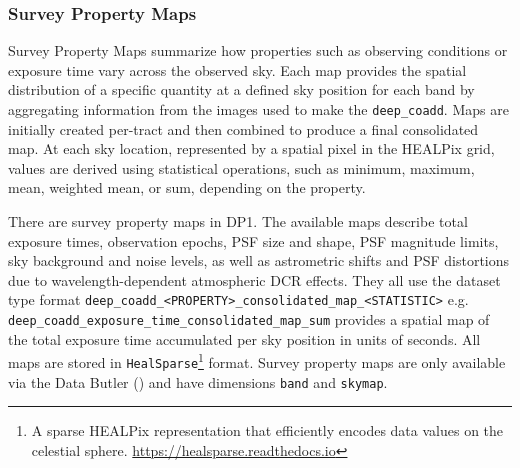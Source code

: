 \subsubsection{Survey Property Maps}
Survey Property Maps summarize how properties such as observing conditions or exposure time vary across the observed sky.
Each map provides the spatial distribution of a specific quantity at a defined sky position for each band by aggregating information from the images used to make the \texttt{deep\_coadd}.
Maps are initially created per-\gls{tract} and then combined to produce a final consolidated map.
At each sky location, represented by a spatial pixel in the \gls{HEALPix} grid, values are derived using statistical operations, such as minimum, maximum, mean, weighted mean, or sum, depending on the property.

There are \nsurveypropertymaps survey property maps in \gls{DP1}.
The available maps describe total exposure times, observation epochs, \gls{PSF} size and \gls{shape}, \gls{PSF} magnitude limits, sky \gls{background} and noise levels, as well as astrometric shifts and \gls{PSF} distortions due to wavelength-dependent atmospheric \gls{DCR} effects.
They all use the dataset type  format \texttt{deep\_coadd\_<PROPERTY>\_consolidated\_map\_<STATISTIC>}
e.g. \texttt{deep\_coadd\_exposure\_time\_consolidated\_map\_sum} provides a spatial map of the total exposure time accumulated per
sky position in units of seconds.
All maps are stored in \texttt{HealSparse}\footnote{A sparse \gls{HEALPix}
representation that efficiently encodes data values on the celestial sphere. \url{https://healsparse.readthedocs.io}}\citep{2005ApJ...622..759G} format.
Survey property maps are only available via the Data \gls{Butler} () and  have dimensions \texttt{band} and \texttt{skymap}.

